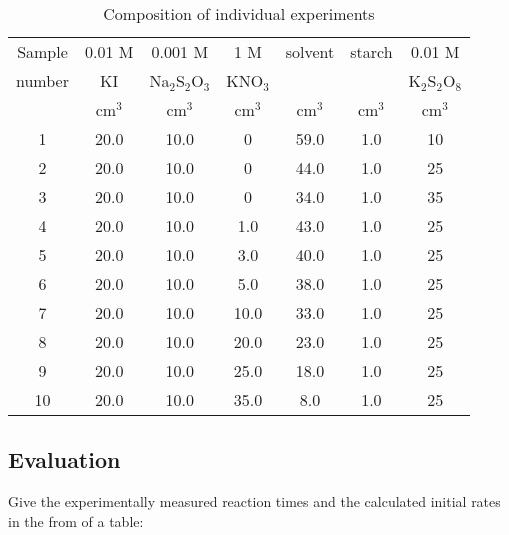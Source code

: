 \begin{table}[H]
\caption{Composition of individual experiments}
\begin{tabular}{|c|c|c|c|c|c|c|}
\hline
Sample& 0.01 M & 0.001 M & 1 M  & solvent & starch & 0.01 M  \\

number & KI & Na$_2$S$_2$O$_3$ & KNO$_3$ & &  & K$_2$S$_2$O$_8$ \\

   & cm$^3$ & cm$^3$ & cm$^3$ & cm$^3$ & cm$^3$ & cm$^3$ \\

\hline
1 & 20.0 & 10.0 & 0 & 59.0 & 1.0 & 10 \\

\hline
2 & 20.0 & 10.0 & 0 & 44.0 & 1.0 & 25 \\

\hline
3 & 20.0 & 10.0 & 0 & 34.0 & 1.0 & 35 \\

\hline
4 & 20.0 & 10.0 & 1.0 & 43.0 & 1.0 & 25 \\

\hline
5 & 20.0 & 10.0 & 3.0 & 40.0 & 1.0 & 25 \\

\hline
6 & 20.0 & 10.0 & 5.0 & 38.0 & 1.0 & 25 \\

\hline
7 & 20.0 & 10.0 & 10.0 & 33.0 & 1.0 & 25 \\

\hline
8 & 20.0 & 10.0 & 20.0 & 23.0 & 1.0 & 25 \\

\hline
9 & 20.0 & 10.0 & 25.0 & 18.0 & 1.0 & 25 \\

\hline
10 & 20.0 & 10.0 & 35.0 & 8.0 & 1.0 & 25 \\

\hline

\end{tabular}
\end{table}

\subsection{Evaluation}

Give the experimentally measured reaction times and the calculated initial rates in the from of a table:

